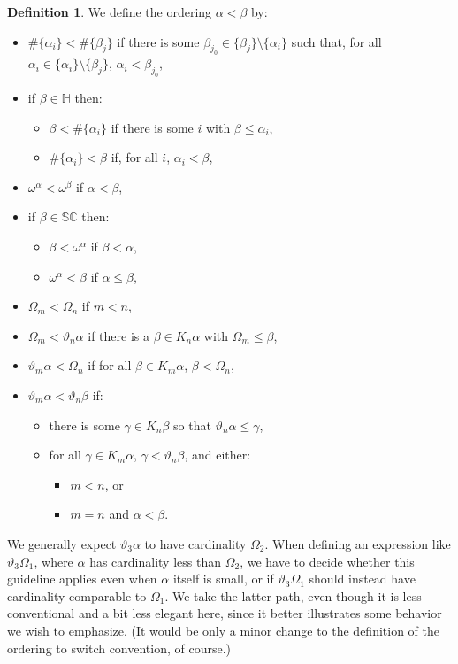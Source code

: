 \documentclass[11pt]{amsart}
\theoremstyle{definition}
\newtheorem{definition}[theorem]{Definition}
\begin{document}
\begin{definition}
  We define the ordering $\alpha<\beta$ by:
  \begin{itemize}
\item $\#\{\alpha_i\}<\#\{\beta_j\}$ if there is some $\beta_{j_0}\in\{\beta_j\}\setminus\{\alpha_i\}$ such that, for all $\alpha_i\in\{\alpha_i\}\setminus\{\beta_j\}$, $\alpha_i<\beta_{j_0}$,
\item if $\beta\in\mathbb{H}$ then:
  \begin{itemize}
  \item $\beta<\#\{\alpha_i\}$ if there is some $i$ with $\beta\leq\alpha_i$,
  \item $\#\{\alpha_i\}<\beta$ if, for all $i$, $\alpha_i<\beta$,
  \end{itemize}
\item $\omega^\alpha<\omega^\beta$ if $\alpha<\beta$,
\item if $\beta\in\mathbb{SC}$ then:
  \begin{itemize}
  \item $\beta<\omega^\alpha$ if $\beta<\alpha$,
  \item $\omega^\alpha<\beta$ if $\alpha\leq\beta$,
  \end{itemize}
\item $\Omega_m<\Omega_n$ if $m<n$,
\item $\Omega_m<\vartheta_n\alpha$ if there is a $\beta\in K_n\alpha$ with $\Omega_m\leq\beta$,
\item $\vartheta_m\alpha<\Omega_n$ if for all $\beta\in K_m\alpha$, $\beta<\Omega_n$,
\item $\vartheta_m\alpha<\vartheta_n\beta$ if:
  \begin{itemize}
  \item there is some $\gamma\in K_n\beta$ so that $\vartheta_n\alpha\leq\gamma$,
  \item for all $\gamma\in K_m\alpha$, $\gamma<\vartheta_n\beta$, and either:
    \begin{itemize}
    \item $m<n$, or
    \item $m=n$ and $\alpha<\beta$.
    \end{itemize}
  \end{itemize}
\end{itemize}
\end{definition}

We generally expect $\vartheta_3\alpha$ to have cardinality $\Omega_2$. When defining an expression like $\vartheta_3\Omega_1$, where $\alpha$ has cardinality less than $\Omega_2$, we have to decide whether this guideline applies even when $\alpha$ itself is small, or if $\vartheta_3\Omega_1$ should instead have cardinality comparable to $\Omega_1$. We take the latter path, even though it is less conventional and a bit less elegant here, since it better illustrates some behavior we wish to emphasize. (It would be only a minor change to the definition of the ordering to switch convention, of course.)
\end{document}
